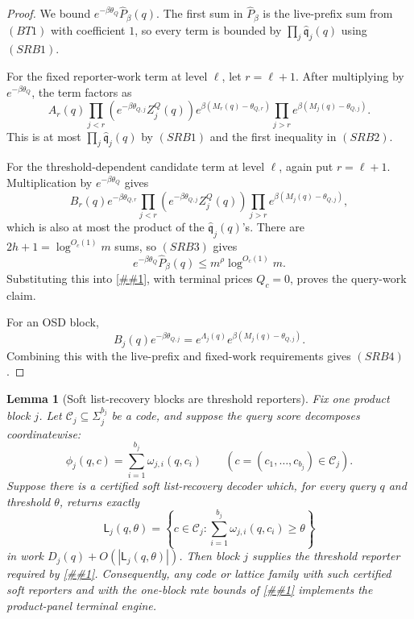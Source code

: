 \documentclass[10pt]{article}
\newcommand{\cref}[1]{\ref{##1}}
\newtheorem{lemma}[theorem]{Lemma}
\theoremstyle{definition}
\begin{document}
\begin{proof}
   We bound \(e^{-\beta\theta_Q}\widehat P_\beta(q)\).  The first sum in
   \(\widehat P_\beta\) is the live-prefix sum from \((BT1)\) with coefficient
   \(1\), so every term is bounded by
   \(\prod_j\widehat{\mathfrak q}_j(q)\) using \((SRB1)\).

   For the fixed reporter-work term at level \(\ell\), let \(r=\ell+1\).
   After multiplying by \(e^{-\beta\theta_Q}\), the term factors as
   \[
      A_r(q)
      \prod_{j<r}\left(e^{-\beta\theta_{Q,j}}Z_j^Q(q)\right)
      e^{\beta(M_r(q)-\theta_{Q,r})}
      \prod_{j>r}e^{\beta(M_j(q)-\theta_{Q,j})}.
   \]
   This is at most \(\prod_j\widehat{\mathfrak q}_j(q)\) by \((SRB1)\) and
   the first inequality in \((SRB2)\).

   For the threshold-dependent candidate term at level \(\ell\), again put
   \(r=\ell+1\).  Multiplication by \(e^{-\beta\theta_Q}\) gives
   \[
      B_r(q)e^{-\beta\theta_{Q,r}}
      \prod_{j<r}\left(e^{-\beta\theta_{Q,j}}Z_j^Q(q)\right)
      \prod_{j>r}e^{\beta(M_j(q)-\theta_{Q,j})},
   \]
   which is also at most the product of the
   \(\widehat{\mathfrak q}_j(q)\)'s.  There are \(2h+1=\log^{O_c(1)}m\) sums,
   so \((SRB3)\) gives
   \[
      e^{-\beta\theta_Q}\widehat P_\beta(q)
      \le m^\rho\log^{O_c(1)}m .
   \]
   Substituting this into \cref{lem:superset-product-panel-decoder}, with
   terminal prices \(Q_c=0\), proves the query-work claim.

   For an OSD block,
   \[
      B_j(q)e^{-\beta\theta_{Q,j}}
      =
      e^{\Lambda_j(q)}e^{\beta(M_j(q)-\theta_{Q,j})}.
   \]
   Combining this with the live-prefix and fixed-work requirements gives
   \((SRB4)\).
\end{proof}

\begin{lemma}[Soft list-recovery blocks are threshold reporters]
   \label{lem:soft-list-recovery-reporter}
   Fix one product block \(j\).  Let
   \(\mathcal C_j\subseteq\Sigma_j^{b_j}\) be a code, and suppose the query
   score decomposes coordinatewise:
   \[
      \phi_j(q,c)=\sum_{i=1}^{b_j}\omega_{j,i}(q,c_i)
      \qquad(c=(c_1,\ldots,c_{b_j})\in\mathcal C_j).
   \]
   Suppose there is a certified soft list-recovery decoder which, for every
   query \(q\) and threshold \(\theta\), returns exactly
   \[
      \mathsf L_j(q,\theta)
      =
      \left\{
      c\in\mathcal C_j:
      \sum_{i=1}^{b_j}\omega_{j,i}(q,c_i)\ge\theta
      \right\}
   \]
   in work \(D_j(q)+O(|\mathsf L_j(q,\theta)|)\).  Then block \(j\) supplies
   the threshold reporter required by
   \cref{lem:additive-product-panel-decoder}.  Consequently, any
   code or lattice family with such certified soft reporters and with the
   one-block rate bounds of \cref{cor:product-panel-rate-bookkeeping}
   implements the product-panel terminal engine.
\end{lemma}
\end{document}
